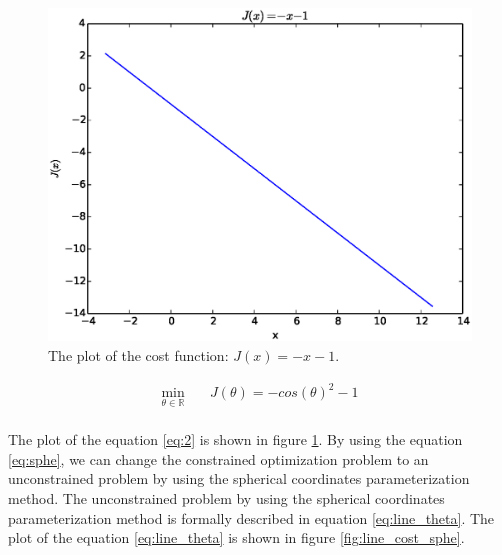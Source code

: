 \documentclass[a4paper,12pt]{article}
\begin{document}
\begin{figure}[H]
\begin{center}
\includegraphics[width=1.0\linewidth]{line.eps}

\end{center}
   \caption{The plot of the cost function: $J(x) = -x-1$.  }
\label{fig:line_cost}
\end{figure}

\begin{equation}\label{eq:line_theta}
\begin{aligned}
\min_{\theta\in \mathbb{R}} \quad & J(\theta) = -cos(\theta)^2-1\\
\end{aligned}
\end{equation}

The plot of the equation \ref{eq:2} is shown in figure \ref{fig:line_cost}. By using the equation \ref{eq:sphe}, we can change the constrained optimization problem to an unconstrained problem by using the spherical coordinates parameterization method. The unconstrained problem by using the spherical coordinates parameterization method is formally described in equation \ref{eq:line_theta}. The plot of the equation \ref{eq:line_theta} is shown in figure \ref{fig:line_cost_sphe}.\\  


\end{document}
